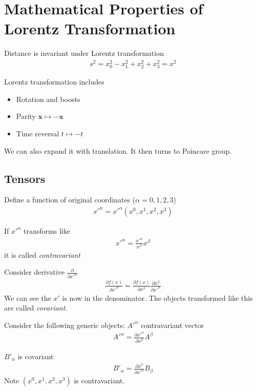 \section{Mathematical Properties of Lorentz Transformation}

Distance is invariant under Lorentz transformation
\begin{align}
   s^2 = x_0^2 - x_1^2 + x_2^2 + x_3^2 = x^2
\end{align}

Lorentz transformation includes
\begin{itemize}
   \item Rotation and boosts
   \item Parity $\pmb{x} \mapsto -\pmb{x}$
   \item Time reversal $t \mapsto -t$
\end{itemize}

We can also expand it with translation. It then turns to Poincare group.

\subsection{Tensors}
Define a function of original coordinates ($\alpha=0,1,2,3$)
\begin{align}
   x'^\alpha = x'^\alpha (x^0, x^1, x^2, x^3)
\end{align}

If $x'^\alpha$ transforms like
\begin{align}
   x'^\alpha = \frac{x'^\alpha}{x^\beta} x^\beta
\end{align}
it is called \textit{contravariant}

Consider derivative $\frac{\partial}{\partial x'^\alpha}$
\begin{align}
   \frac{\partial f(x)}{\partial x'^\alpha} = \frac{\partial f(x)}{\partial x^\beta} \frac{\partial x^\beta}{\partial x'^\alpha}
\end{align}
We can see the $x'$ is now in the denominator. The objects transformed like this are called \textit{covariant}.

Consider the following generic objects: $A'^\alpha$ contravariant vector
\begin{align}
   A'^\alpha = \frac{\partial x'^\alpha}{\partial x^\beta} A^\beta
\end{align}

$B'_\alpha$ is covariant
\begin{align}
   B'_\alpha = \frac{\partial x^\beta}{\partial x'^\alpha} B_\beta
\end{align}
Note $(x^0, x^1, x^2, x^3)$ is contravariant.

